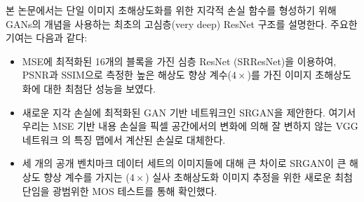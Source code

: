 \documentclass[10pt,twocolumn,letterpaper]{article}
\newcommand{\kor}[1]{#1}
\newcommand{\eng}[1]{}
\begin{document}
\eng{
In this paper we describe the first very deep \ac{ResNet} \cite{he2015deep,he2016identity} architecture using the concept of \acp{GAN} to form a perceptual loss function for photo-realistic \ac{SISR}. Our main contributions are:
}\kor{
본 논문에서는 \ac{단일 이미지 초해상도화}를 위한 지각적 손실 함수를 형성하기 위해 \acp{GAN}의 개념을 사용하는 최초의 고심층(very deep) \ac{ResNet} \cite{he2015deep,he2016identity} 구조를 설명한다. 주요한 기여는 다음과 같다:
}
\begin{itemize}
\item \eng{
We set a new state of the art for image \ac{SR} with high upscaling factors ($4\times$) as measured by \ac{PSNR} and \ac{SSIM} with our 16 blocks deep \ac{ResNet} (SRResNet) optimized for \ac{MSE}.
}\kor{
\ac{MSE}에 최적화된 16개의 블록을 가진 심층 \ac{ResNet} (SRResNet)을 이용하여, \ac{PSNR}과 \ac{SSIM}으로 측정한 높은 해상도 향상 계수($4\times$)를 가진 이미지 초해상도화에 대한 최첨단 성능을 보였다.
} %
\item \eng{
We propose SRGAN which is a \ac{GAN}-based network optimized for a new perceptual loss. Here we replace the \ac{MSE}-based content loss with a loss calculated on feature maps of the VGG network \cite{simonyan2014very}, which are more invariant to changes in pixel space \cite{Li2016}.
}\kor{
새로운 지각 손실에 최적화된 \ac{GAN} 기반 네트워크인 SRGAN을 제안한다. 여기서 우리는 \ac{MSE} 기반 내용 손실을 픽셀 공간\cite{Li2016}에서의 변화에 의해 잘 변하지 않는 VGG 네트워크 \cite{simonyan2014very}의 특징 맵에서 계산된 손실로 대체한다.
} %
\item \eng{
We confirm with an extensive \ac{MOS} test on images from three public benchmark datasets that SRGAN is the new state of the art, by a large margin, for the estimation of photo-realistic \ac{SR} images with high upscaling factors ($4\times$).
}\kor{
세 개의 공개 벤치마크 데이터 세트의 이미지들에 대해 큰 차이로 SRGAN이 큰 해상도 향상 계수를 가지는 ($4\times$) 실사 \ac{초해상도화} 이미지 추정을 위한 새로운 최첨단임을 광범위한 \ac{MOS} 테스트를 통해 확인했다.
}
\end{itemize}
\end{document}
